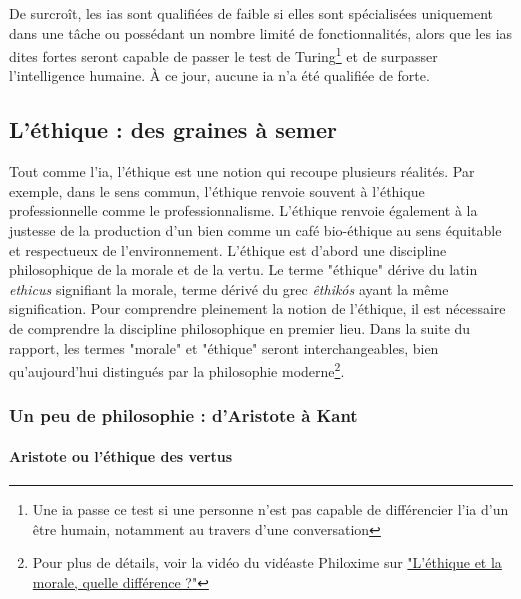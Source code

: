 De surcroît, les \glspl{ia} sont qualifiées de faible si elles sont spécialisées uniquement dans une tâche ou possédant un nombre limité de fonctionnalités, alors que les \glspl{ia} dites fortes seront capable de passer le test de Turing\footnote{Une \gls{ia} passe ce test si une personne n'est pas capable de différencier l'\gls{ia} d'un être humain, notamment au travers d'une conversation} et de surpasser l'intelligence humaine. À ce jour, aucune \gls{ia} n'a été qualifiée de forte.







\subsection{L'éthique : des graines à semer}\label{subsection:ethique}

Tout comme l'\gls{ia}, l'éthique est une notion qui recoupe plusieurs réalités. Par exemple, dans le sens commun, l'éthique renvoie souvent à l'éthique professionnelle comme le professionnalisme. L'éthique renvoie également à la justesse de la production d'un bien comme un café bio-éthique au sens équitable et respectueux de l'environnement.
L'éthique est d'abord une discipline philosophique de la morale et de la vertu. Le terme "éthique" dérive du latin \textit{ethicus} signifiant la morale, terme dérivé du grec \textit{êthikós} ayant la même signification. Pour comprendre pleinement la notion de l'éthique, il est nécessaire de comprendre la discipline philosophique en premier lieu. Dans la suite du rapport, les termes "morale" et "éthique" seront interchangeables, bien qu'aujourd'hui distingués par la philosophie moderne\footnote{Pour plus de détails, voir la vidéo du vidéaste Philoxime sur  \href{https://tournesol.app/entities/yt:HTAXqpMKm8M}{"L'éthique et la morale, quelle différence ?"}}.

\subsubsection{Un peu de philosophie : d'Aristote à Kant}

\paragraph{Aristote ou l'éthique des vertus}

